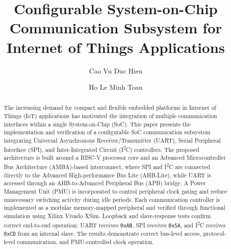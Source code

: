 \documentclass[runningheads]{llncs}
\begin{document}
\title{Configurable System-on-Chip Communication Subsystem for Internet of Things Applications}

\author{Cao Vu Duc Hieu \and Ho Le Minh Toan}


\maketitle

\begin{abstract}
The increasing demand for compact and flexible embedded platforms in Internet of Things (IoT) applications has motivated the integration of multiple communication interfaces within a single System-on-Chip (SoC). This paper presents the implementation and verification of a configurable SoC communication subsystem integrating Universal Asynchronous Receiver/Transmitter (UART), Serial Peripheral Interface (SPI), and Inter-Integrated Circuit (I\textsuperscript{2}C) controllers. The proposed architecture is built around a RISC-V processor core and an Advanced Microcontroller Bus Architecture (AMBA)-based interconnect, where SPI and I\textsuperscript{2}C are connected directly to the Advanced High-performance Bus Lite (AHB-Lite), while UART is accessed through an AHB-to-Advanced Peripheral Bus (APB) bridge. A Power Management Unit (PMU) is incorporated to control peripheral clock gating and reduce unnecessary switching activity during idle periods. Each communication controller is implemented as a modular memory-mapped peripheral and verified through functional simulation using Xilinx Vivado XSim. Loopback and slave-response tests confirm correct end-to-end operation: UART receives \texttt{0xAB}, SPI receives \texttt{0x5A}, and I\textsuperscript{2}C receives \texttt{0xCD} from an internal slave. The results demonstrate correct bus-level access, protocol-level communication, and PMU-controlled clock operation.

\end{abstract}
\end{document}
